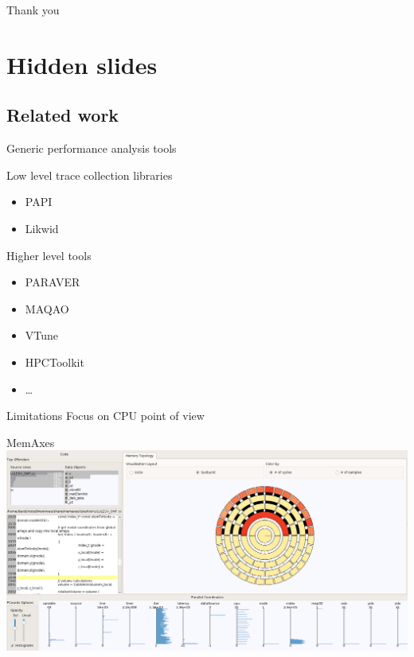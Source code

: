 \documentclass[xcolor={usenames,dvipsnames},hyperref={pdfusetitle}]{beamer}
\begin{document}
\appendix

\begin{frame}{}
    \centering
    \Huge
    Thank you
\end{frame}

\section*{Hidden slides}

\subsection*{Related work}
\begin{frame}{Generic performance analysis tools}
    \begin{block}{Low level trace collection libraries}
        \begin{itemize}
            \item PAPI~\cite{Browne00Portable}
            \item Likwid~\cite{Treibig10LIKWID}
        \end{itemize}
    \end{block}
    \pause
    \begin{block}{Higher level tools}
        \begin{itemize}
            \item PARAVER~\cite{Pillet95PARAVER}
            \item MAQAO~\cite{Djoudi05MAQAO}
            \item VTune~\cite{Reinders05VTune}
            \item HPCToolkit~\cite{Adhianto10HPCTOOLKIT}
            \item \ldots
        \end{itemize}
    \end{block}
    \pause
    \begin{alertblock}{Limitations}
        Focus on CPU point of view
    \end{alertblock}
\end{frame}

\begin{frame}{MemAxes}
    \centering
    \includegraphics[width=\linewidth]{memAxes}
\end{frame}
\end{document}
